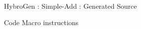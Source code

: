 \begin{Frame}{HybroGen : Simple-Add : Generated Source}
  \begin{block}{Code Macro instructions}
    
  \end{block}
\end{Frame}
